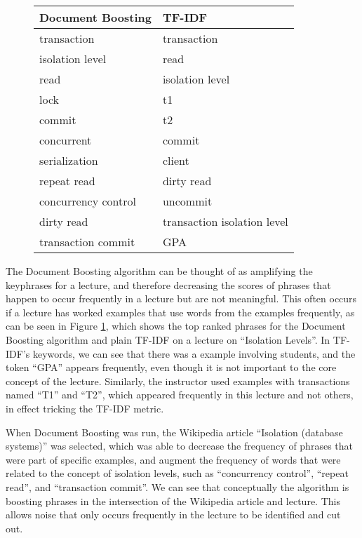 
\begin{figure}[h!]
\caption{}
\label{fig:document_boosting_v_tfidf}
\begin{tabular}{|l|l|}
\hline
\textbf{Document Boosting} & \textbf{TF-IDF} \\
\hline
transaction & transaction \\
\hline
isolation level & read \\
\hline
read & isolation level \\
\hline
lock & t1 \\
\hline
commit & t2 \\
\hline
concurrent & commit \\
\hline
serialization & client \\ 
\hline
repeat read & dirty read \\
\hline
concurrency control & uncommit \\
\hline
dirty read & transaction isolation level \\ 
\hline
transaction commit & GPA \\
\hline
\end{tabular}
\end{figure}

The Document Boosting algorithm can be thought of as amplifying the keyphrases for a lecture, and therefore decreasing the scores of phrases that happen to occur frequently in a lecture but are not meaningful. This often occurs if a lecture has worked examples that use words from the examples frequently, as can be seen in Figure \ref{fig:document_boosting_v_tfidf}, which shows the top ranked phrases for the Document Boosting algorithm and plain TF-IDF on a lecture on ``Isolation Levels''. In TF-IDF's keywords, we can see that there was a example involving students, and the token ``GPA'' appears frequently, even though it is not important to the core concept of the lecture. Similarly, the instructor used examples with transactions named ``T1'' and ``T2'', which appeared frequently in this lecture and not others, in effect tricking the TF-IDF metric.

When Document Boosting was run, the Wikipedia article ``Isolation (database systems)'' was selected, which was able to decrease the frequency of phrases that were part of specific examples, and augment the frequency of words that were related to the concept of isolation levels, such as ``concurrency control'', ``repeat read'', and ``transaction commit''. We can see that conceptually the algorithm is boosting phrases in the intersection of the Wikipedia article and lecture. This allows noise that only occurs frequently in the lecture to be identified and cut out.

